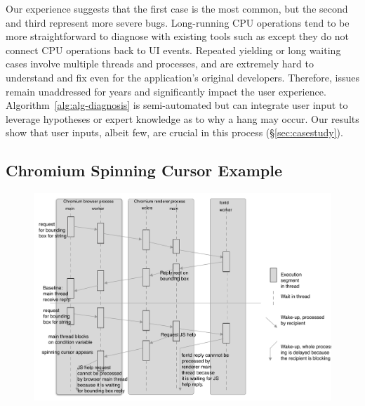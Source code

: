 \noindent
Our experience suggests that the first case is the most common, but the
second and third represent more severe bugs. Long-running CPU operations tend to
be more straightforward to diagnose with existing tools such as \spindump except
they do not connect CPU operations back to UI events. Repeated yielding or
long waiting cases involve multiple threads and processes, and are extremely
hard to understand and fix even for the application's original developers.
Therefore, issues remain unaddressed for years and significantly impact the
user experience. Algorithm~\ref{alg:alg-diagnosis} is semi-automated but can
integrate user input to leverage hypotheses or expert knowledge
as to why a hang may occur. Our results show that user inputs, albeit few, are
crucial in this process (\S\ref{sec:casestudy}).

\subsection{Chromium Spinning Cursor Example}

\begin{figure}[tb]
	\footnotesize
    \centering
	\includegraphics[width=\columnwidth]{./figures/chromium_case_study_2.pdf}
\end{figure}

